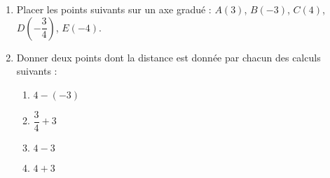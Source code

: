 
\begin{exercice}\label{exo2smath-0238}

    \begin{enumerate}
        \item
            Placer les points suivants sur un axe gradué : \( A(3)\), \( B(-3)\), \( C(4)\), \( D(-\dfrac{ 3 }{ 4 })\), \( E(-4)\).
        \item
            Donner deux points dont la distance est donnée par chacun des calculs suivants :
            \begin{enumerate}
                \item
                    \( 4-(-3)\)
                \item
                    \( \dfrac{ 3 }{ 4 }+3\)
                \item
                    \( 4-3\)
                \item
                    \( 4+3\)
            \end{enumerate}
    \end{enumerate}

\end{exercice}
